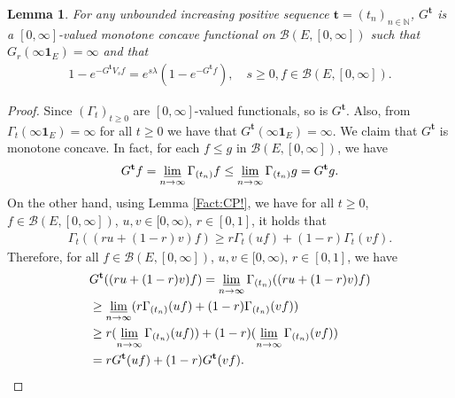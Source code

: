 \documentclass[12pt,a4paper]{amsart}
\numberwithin{equation}{section}
\theoremstyle{plain}
\newtheorem{lem}[thm]{Lemma}
\theoremstyle{definition}
\theoremstyle{remark}
\begin{document}
\begin{lem} \label{prop:Gtb:H1:H2:H3:H4}
	For any unbounded increasing positive sequence $\mathbf t = (t_n)_{n\in \mathbb N}$, 
	$G^\mathbf t$ is a $[0,\infty]$-valued monotone concave functional on $\mathcal B(E,[0,\infty])$ such that $G_r(\infty \mathbf 1_E) = \infty$ and that
	\begin{align}
	1 - e^{-G^\mathbf t V_s f}
	= e^{s\lambda} (1-e^{- G^\mathbf t f}),
	\quad s\geq 0, f\in \mathcal B(E,[0,\infty]).
	\end{align}
\end{lem}
\begin{proof}
	Since $(\Gamma_t)_{t\geq 0}$ are $[0,\infty]$-valued functionals, so is $G^{\mathbf t}$.
	Also, from $\Gamma_t(\infty  \mathbf 1_E) = \infty$ for all $t\geq 0$ we have that $G^{\mathbf t}(\infty  \mathbf 1_E) = \infty$.
	We claim that $G^\mathbf t$ is monotone concave.
	In fact, for each $f \leq g$ in $\mathcal B(E,[0,\infty])$, we have
	\begin{equation}
	G^{\mathbf t} f
	= \varliminf_{n\to \infty} \Gamma_{(t_n)} f
	\leq \varliminf_{n\to \infty} \Gamma_{(t_n)} g
	= G^{\mathbf t} g.
	\end{equation}
	On the other hand, using Lemma \ref{Fact:CP!}, we have for all $t\geq 0$, $f\in \mathcal B(E,[0,\infty])$, $u,v \in [0,\infty)$, $r\in [0,1]$, it holds that
	\begin{align}
	\Gamma_t((ru+(1-r) v)f)
	\geq r \Gamma_t (uf) + (1-r) \Gamma_t (vf).
	\end{align}
	Therefore, for all $f\in \mathcal B(E,[0,\infty])$, $u,v \in [0,\infty)$, $r \in [0,1]$, we have
	\begin{align}
	& G^{\mathbf t}((ru + (1-r)v)f)
	= \varliminf_{n \to \infty} \Gamma_{(t_n)}((ru + (1-r)v)f)
	\\&\geq \varliminf_{n\to \infty} (r\Gamma_{(t_n)} (uf) + (1-r)\Gamma_{(t_n)}(vf))
	\\&\geq r (\varliminf_{n\to \infty} \Gamma_{(t_n)} (uf)) + (1-r) (\varliminf_{n\to \infty} \Gamma_{(t_n)}(vf) )
	\\&= r G^{\mathbf t} (uf) + (1-r) G^{\mathbf t}(vf).
	\end{align}
	

\end{proof}
\end{document}
